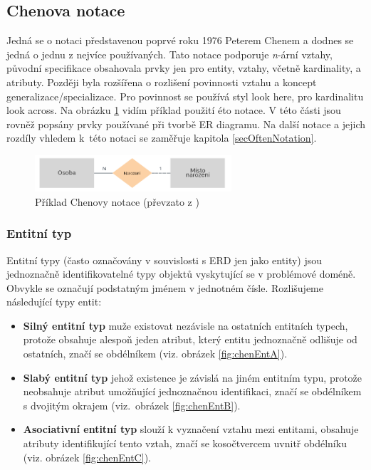 \documentclass[czech,bachelor,public,dept460,male,oneside]{diploma}
\begin{document}
	\subsection{Chenova notace} \label{erDiagramFeatures}
	Jedná se o notaci představenou poprvé roku 1976 Peterem Chenem \cite{chenERD} a dodnes se jedná o jednu z nejvíce používaných. Tato notace podporuje \textit{n}-ární vztahy, původní specifikace obsahovala prvky jen pro entity, vztahy, včetně kardinality, a atributy. Později byla rozšířena o rozlišení povinnosti vztahu a koncept generalizace/specializace. Pro povinnost se používá styl look here, pro kardinalitu look across. Na obrázku \ref{fig:chenExample} vidím příklad použití éto notace. V této části jsou rovněž popsány prvky používané při tvorbě ER diagramu. Na další notace a jejich rozdíly vhledem k~této notaci se zaměřuje kapitola \ref{secOftenNotation}.
	
	\begin{figure}[!h]
		\centering
		\includegraphics[width=0.65\textwidth]{Figures/NotationExChen}
		\caption[Příklad Chenovy notace]{Příklad Chenovy notace (převzato z \cite{whatIsERD})}
		\label{fig:chenExample}
	\end{figure}
	
		\subsubsection{Entitní typ}
		Entitní typy (často označovány v souvislosti s ERD jen jako entity) jsou jednoznačně identifikovatelné typy objektů vyskytující se v problémové doméně. Obvykle se označují podstatným jménem v jednotném čísle. Rozlišujeme následující typy entit:
	
		\begin{itemize}
			\item \textbf{Silný entitní typ} muže existovat nezávisle na ostatních entitních typech, protože obsahuje alespoň jeden atribut, který entitu jednoznačně odlišuje od ostatních, značí se obdélníkem (viz. obrázek \ref{fig:chenEntA}).
			
			\item \textbf{Slabý entitní typ} jehož existence je závislá na jiném entitním typu, protože neobsahuje atribut umožňující jednoznačnou identifikaci, značí se obdélníkem s dvojitým okrajem (viz.~obrázek \ref{fig:chenEntB}).
			
			\item \textbf{Asociativní entitní typ} slouží k vyznačení vztahu mezi entitami, obsahuje atributy identifikující tento vztah, značí se kosočtvercem uvnitř obdélníku (viz. obrázek \ref{fig:chenEntC}).
		\end{itemize}
	
\end{document}
